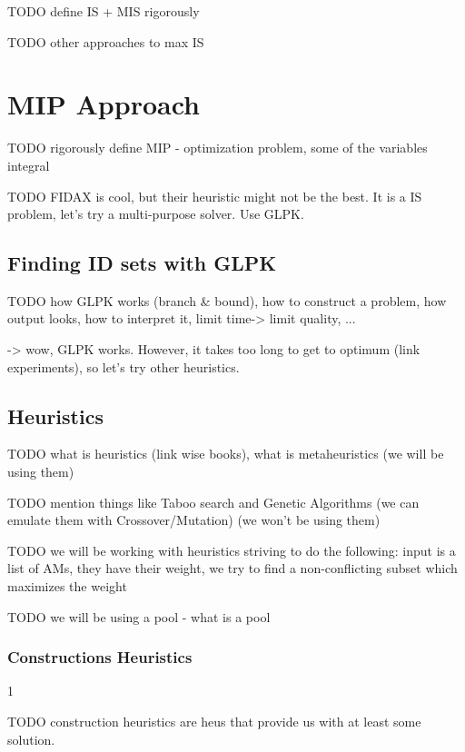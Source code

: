 \documentclass[a4paper,12pt,oneside]{report}
\begin{document}
TODO define IS + MIS rigorously

TODO other approaches to max IS

\chapter{MIP Approach}

TODO rigorously define MIP - optimization problem, some of the variables integral

TODO FIDAX is cool, but their heuristic might not be the best. It is a IS problem, let's try a multi-purpose solver. Use GLPK. 

\section{Finding ID sets with GLPK}

TODO how GLPK works (branch \& bound), how to construct a problem, how output looks, how to interpret it, limit time-> limit quality, ...
 
 -> wow, GLPK works. However, it takes too long to get to optimum (link experiments), so let's try other heuristics.
 
\section{Heuristics}

TODO what is heuristics (link wise books), what is metaheuristics (we will be using them)

TODO mention things like Taboo search and Genetic Algorithms (we can emulate them with Crossover/Mutation) (we won't be using them)

TODO we will be working with heuristics striving to do the following: input is a list of AMs, they have their weight, we try to find a non-conflicting subset which maximizes the weight

TODO we will be using a pool - what is a pool

\subsection{Constructions Heuristics}
1

TODO construction heuristics are heus that provide us with at least some solution.
\end{document}
